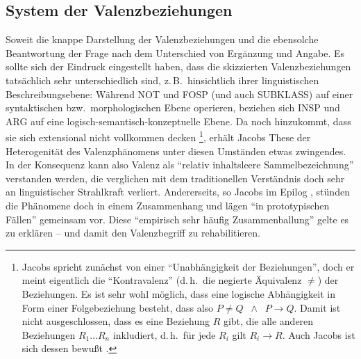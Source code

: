 \subsection{System der Valenzbeziehungen} \label{sec:valenz:system}

Soweit die knappe Darstellung der Valenzbeziehungen und die ebensolche Beantwortung der Frage nach dem Unterschied von Ergänzung und Angabe. Es sollte sich der Eindruck eingestellt haben, dass die skizzierten Valenzbeziehungen tatsächlich sehr unterschiedlich sind, z.\,B.\ hinsichtlich ihrer linguistischen Beschreibungsebene: Während NOT und FOSP (und auch SUBKLASS) auf einer syntaktischen bzw.\ morphologischen Ebene operieren, beziehen sich INSP und ARG auf eine logisch-semantisch-konzeptuelle Ebene. Da noch hinzukommt, dass sie sich extensional nicht vollkommen decken \citep[Kapitel~5]{Jacobs:94}\footnote{Jacobs spricht zunächst von einer "`Unabhängigkeit der Beziehungen"', doch er meint eigentlich die "`Kontravalenz"' (d.\,h.\ die negierte Äquivalenz $\neq$) der Beziehungen. Es ist sehr wohl möglich, dass eine logische Abhängigkeit in Form einer Folgebeziehung besteht, dass also $P \neq Q \;\; \wedge \;\; P \to Q$. Damit ist nicht ausgeschlossen, dass es eine Beziehung $R$ gibt, die alle anderen Beziehungen $R_1 \ldots R_n$ inkludiert, d.\,h.\ für jede $R_i$ gilt $R_i \to R$. Auch Jacobs ist sich dessen bewu\ss t \citep[52,64]{Jacobs:94}.}, erhält Jacobs These der Heterogenität des Valenzphänomens unter diesen Umständen etwas zwingendes.  In der Konsequenz kann also Valenz als "`relativ inhaltsleere Sammelbezeichnung"' \citep[55]{Jacobs:94} verstanden werden, die verglichen mit dem traditionellen Verständnis doch sehr an linguistischer Strahlkraft verliert. Andererseits, so Jacobs im Epilog \citep[71]{Jacobs:94}, stünden die Phänomene doch in einem Zusammenhang und lägen "`in prototypischen Fällen"' gemeinsam vor. Diese "`empirisch sehr häufig Zusammenballung"' gelte es zu erklären -- und damit den Valenzbegriff zu rehabilitieren. 

